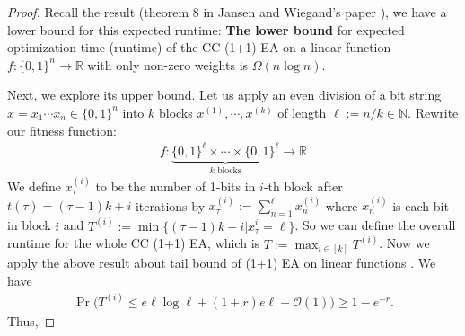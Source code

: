 \documentclass[a4paper,11pt]{report}
\theoremstyle{plain} %
\theoremstyle{definition} %
\theoremstyle{remark} %
\begin{document}
\begin{proof} Recall the result (theorem 8 in Jansen and Wiegand's paper \citep{jansen_cooperative_2004}), we have a lower bound for this expected runtime: \textbf{The lower bound} for expected optimization time (runtime) of the CC (1+1) EA on a linear function $f: \{0,1\}^n \rightarrow \mathbb{R}$ with only non-zero weights is $\Omega (n\log n)$. 
\par Next, we explore its upper bound.  Let us apply an even division of a bit string $x=x_{1}\cdots x_{n} \in \{0,1\}^n$ into $k$ blocks $x^{(1)}, \cdots ,x^{(k)}$ of length $\ell :=n/k \in \mathbb{N}$. Rewrite our fitness function:
\begin{align*}
f:  \underbrace{\{0,1\}^\ell \times \cdots \times \{0,1\}^\ell}_{\text{$k$ blocks}}     \rightarrow \mathbb{R}
\end{align*}
We define $x_\tau^(i)$ to be the number of 1-bits in $i$-th block after $t(\tau)=(\tau -1)k+i$ iterations by $x_{\tau}^{(i)}:=\sum_{n=1}^{\ell} x_{n}^{(i)}$ where $x_{n}^{(i)}$ is each bit in block $i$ and $T^{(i)}:=\min \{ (\tau -1)k+i | x_{\tau}^{i} = \ell\}$. So we can define the overall runtime for the whole CC (1+1) EA, which is $T:=\max_{i\in [k]} T^{(i)}$. Now we apply the above result about tail bound of (1+1) EA on linear functions \citep{lehre_general_2018}. We have
 \begin{align}
     \Pr \big(T^{(i)}\leq e\ell \log \ell +(1+r) e\ell +\mathcal{O}(1) \big) \geq 1-e^{-r}. 
 \end{align}
Thus,  


\end{proof}
\end{document}
